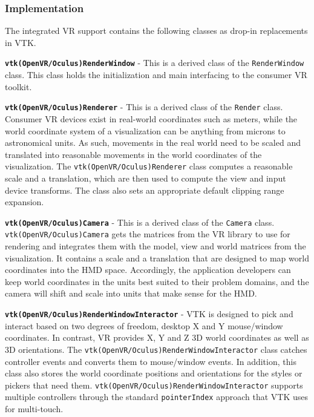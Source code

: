 \subsubsection{Implementation}

The integrated VR support contains the following classes as drop-in replacements in VTK.

\textbf{\texttt{vtk(OpenVR/Oculus)RenderWindow}} - This is a derived class of the \texttt{RenderWindow} class.
This class holds the initialization and main interfacing to the consumer VR toolkit. 

\textbf{\texttt{vtk(OpenVR/Oculus)Renderer}} - This is a derived class of the \texttt{Render} class.
Consumer VR devices exist in real-world coordinates such as meters, while the world coordinate system of a visualization can be anything from microns to astronomical units. As such, movements in the real world need to be scaled and translated into reasonable movements in the world coordinates of the visualization. The \texttt{vtk(OpenVR/Oculus)Renderer} class computes a reasonable scale and a translation, which are then used to compute the view and input device transforms. 
The class also sets an appropriate default clipping range expansion.

\textbf{\texttt{vtk(OpenVR/Oculus)Camera}} - This is a derived class of the \texttt{Camera} class. \texttt{vtk(OpenVR/Oculus)Camera} gets the matrices from the VR library to use for rendering and integrates them with the model, view and world matrices from the visualization. It contains a scale and a translation that are designed to map world coordinates into the HMD space.
Accordingly, the application developers can keep world coordinates in the units best suited to their problem domains, and the camera will shift and scale into units that make sense for the HMD.

\textbf{\texttt{vtk(OpenVR/Oculus)RenderWindowInteractor}} - VTK is designed to pick and interact based on two degrees of freedom, desktop X and Y mouse/window coordinates.
In contrast, VR provides X, Y and Z 3D world coordinates as well as 3D orientations.
The \texttt{vtk(OpenVR/Oculus)RenderWindowInteractor} class catches controller events and converts them to mouse/window events.
In addition, this class also stores the world coordinate positions and orientations for the styles or pickers that need them.
\texttt{vtk(OpenVR/Oculus)RenderWindowInteractor} supports multiple controllers through the standard \texttt{pointerIndex} approach that VTK uses for multi-touch.

